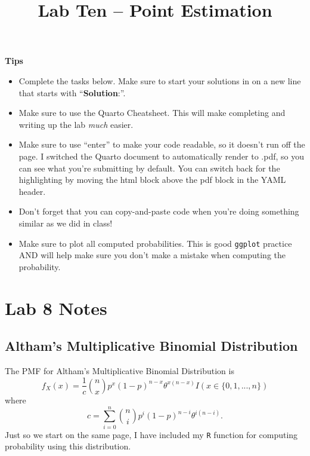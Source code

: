 \documentclass[
]{article}
\title{Lab Ten -- Point Estimation}
\author{}
\date{}
\providecommand{\tightlist}{%
  \setlength{\itemsep}{0pt}\setlength{\parskip}{0pt}}
\begin{document}
\maketitle


\normalsize

\normalsize

\textbf{Tips}

\begin{itemize}
\tightlist
\item
  Complete the tasks below. Make sure to start your solutions in on a
  new line that starts with ``\textbf{Solution}:''.
\item
  Make sure to use the Quarto Cheatsheet. This will make completing and
  writing up the lab \emph{much} easier.
\item
  Make sure to use ``enter'' to make your code readable, so it doesn't
  run off the page. I switched the Quarto document to automatically
  render to .pdf, so you can see what you're submitting by default. You
  can switch back for the highlighting by moving the html block above
  the pdf block in the YAML header.
\item
  Don't forget that you can copy-and-paste code when you're doing
  something similar as we did in class!
\item
  Make sure to plot all computed probabilities. This is good
  \texttt{ggplot} practice AND will help make sure you don't make a
  mistake when computing the probability.
\end{itemize}

\section{Lab 8 Notes}\label{lab-8-notes}

\subsection{Altham's Multiplicative Binomial
Distribution}\label{althams-multiplicative-binomial-distribution}

The PMF for Altham's Multiplicative Binomial Distribution is
\[f_X(x) = \frac{1}{c} {n \choose x} p^x (1-p)^{n-x} \theta^{x(n-x)}I(x \in \{0, 1, ..., n\})\]
where
\[c = \sum_{i=0}^n {n \choose i} p^i (1-p)^{n-i} \theta^{i(n-i)}.\] Just
so we start on the same page, I have included my \texttt{R} function for
computing probability using this distribution.

\normalsize
\end{document}
